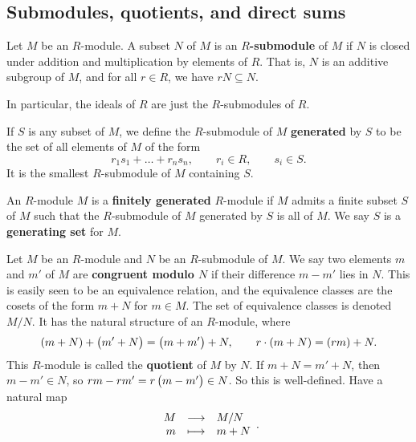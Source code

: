 \pagebreak

\subsection{Submodules, quotients, and direct sums}

\begin{definition}
Let $ M $ be an $ R $-module. A subset $ N $ of $ M $ is an \textbf{$ R $-submodule} of $ M $ if $ N $ is closed under addition and multiplication by elements of $ R $. That is, $ N $ is an additive subgroup of $ M $, and for all $ r \in R $, we have $ rN \subseteq N $.
\end{definition}

In particular, the ideals of $ R $ are just the $ R $-submodules of $ R $.

\begin{definition}
If $ S $ is any subset of $ M $, we define the $ R $-submodule of $ M $ \textbf{generated} by $ S $ to be the set of all elements of $ M $ of the form
$$ r_1s_1 + \dots + r_ns_n, \qquad r_i \in R, \qquad s_i \in S. $$
It is the smallest $ R $-submodule of $ M $ containing $ S $.
\end{definition}

\begin{definition}
An $ R $-module $ M $ is a \textbf{finitely generated} $ R $-module if $ M $ admits a finite subset $ S $ of $ M $ such that the $ R $-submodule of $ M $ generated by $ S $ is all of $ M $. We say $ S $ is a \textbf{generating set} for $ M $.
\end{definition}

\begin{definition}
Let $ M $ be an $ R $-module and $ N $ be an $ R $-submodule of $ M $. We say two elements $ m $ and $ m' $ of $ M $ are \textbf{congruent modulo $ N $} if their difference $ m - m' $ lies in $ N $. This is easily seen to be an equivalence relation, and the equivalence classes are the cosets of the form $ m + N $ for $ m \in M $. The set of equivalence classes is denoted $ M / N $. It has the natural structure of an $ R $-module, where
$$ \br{m + N} + \br{m' + N} = \br{m + m'} + N, \qquad r \cdot \br{m + N} = \br{rm} + N. $$
This $ R $-module is called the \textbf{quotient} of $ M $ by $ N $. If $ m + N = m' + N $, then $ m - m' \in N $, so $ rm - rm' = r\br{m - m'} \in N $. So this is well-defined. Have a natural map
$$ \function{M}{M / N}{m}{m + N}. $$
\end{definition}

